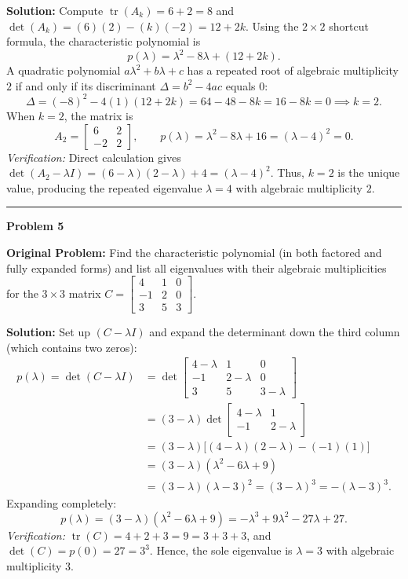 \documentclass[11pt, letterpaper]{article}
\theoremstyle{definition}
\theoremstyle{remark}
\begin{document}
\textbf{Solution:} Compute $\operatorname{tr}(A_k) = 6 + 2 = 8$ and $\det(A_k) = (6)(2) - (k)(-2) = 12 + 2k$. Using the $2 \times 2$ shortcut formula, the characteristic polynomial is
\[
p(\lambda) = \lambda^2 - 8\lambda + (12 + 2k).
\]
A quadratic polynomial $a\lambda^2 + b\lambda + c$ has a repeated root of algebraic multiplicity $2$ if and only if its discriminant $\Delta = b^2 - 4ac$ equals $0$:
\[
\Delta = (-8)^2 - 4(1)(12 + 2k) = 64 - 48 - 8k = 16 - 8k = 0 \implies k = 2.
\] When $k = 2$, the matrix is
\[
A_2 = \begin{bmatrix} 6 & 2 \\ -2 & 2 \end{bmatrix}, \qquad p(\lambda) = \lambda^2 - 8\lambda + 16 = (\lambda - 4)^2 = 0.
\]
\textit{Verification:} Direct calculation gives $\det(A_2 - \lambda I) = (6 - \lambda)(2 - \lambda) + 4 = (\lambda - 4)^2$. Thus, $k = 2$ is the unique value, producing the repeated eigenvalue $\lambda = 4$ with algebraic multiplicity $2$.

\noindent\rule{\textwidth}{0.4pt}

\noindent\textbf{Problem 5}

\textbf{Original Problem:} Find the characteristic polynomial (in both factored and fully expanded forms) and list all eigenvalues with their algebraic multiplicities for the $3 \times 3$ matrix $C = \begin{bmatrix} 4 & 1 & 0 \\ -1 & 2 & 0 \\ 3 & 5 & 3 \end{bmatrix}$.

\textbf{Solution:} Set up $(C - \lambda I)$ and expand the determinant down the third column (which contains two zeros):
\begin{align*}
p(\lambda) = \det(C - \lambda I) &= \det\begin{bmatrix} 4 - \lambda & 1 & 0 \\ -1 & 2 - \lambda & 0 \\ 3 & 5 & 3 - \lambda \end{bmatrix} \\
&= (3 - \lambda)\det\begin{bmatrix} 4 - \lambda & 1 \\ -1 & 2 - \lambda \end{bmatrix} \\
&= (3 - \lambda)\big[(4 - \lambda)(2 - \lambda) - (-1)(1)\big] \\
&= (3 - \lambda)(\lambda^2 - 6\lambda + 9) \\
&= (3 - \lambda)(\lambda - 3)^2 = (3 - \lambda)^3 = -(\lambda - 3)^3.
\end{align*}
Expanding completely:
\[
p(\lambda) = (3 - \lambda)(\lambda^2 - 6\lambda + 9) = -\lambda^3 + 9\lambda^2 - 27\lambda + 27.
\]
\textit{Verification:} $\operatorname{tr}(C) = 4 + 2 + 3 = 9 = 3 + 3 + 3$, and $\det(C) = p(0) = 27 = 3^3$.
Hence, the sole eigenvalue is $\lambda = 3$ with algebraic multiplicity $3$.
\end{document}
